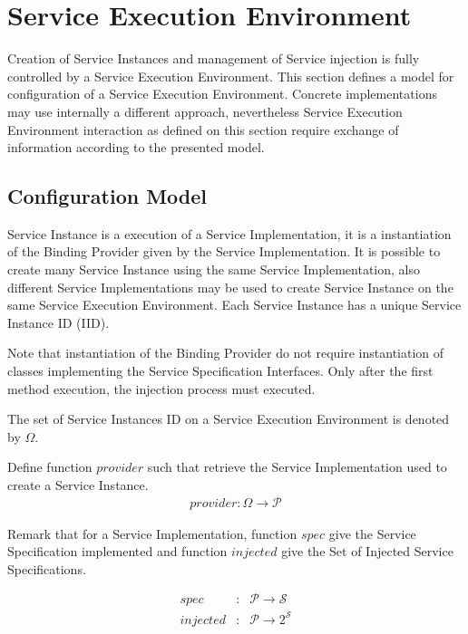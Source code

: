 

\section{Service Execution Environment}
\label{sec:SEE}

Creation of Service Instances and management of Service injection is fully controlled by a Service Execution Environment. This section defines a model for configuration of a Service Execution Environment. Concrete implementations may use internally a different approach, nevertheless Service Execution Environment interaction as defined on this section require exchange of information according to the presented model.

\subsection{Configuration Model}

Service Instance is a execution of a Service Implementation, it is a instantiation of the Binding Provider given by the Service Implementation. It is possible to create many Service Instance using the same Service Implementation, also different Service Implementations may be used to create Service Instance on the same Service Execution Environment. Each Service Instance has a unique Service Instance ID (IID).

Note that instantiation of the Binding Provider do not require instantiation of classes implementing the Service Specification Interfaces. Only after the first method execution, the injection process must executed.

The set of Service Instances ID on a Service Execution Environment is denoted by $\Omega$.

Define function $provider$ such that retrieve the Service Implementation used to create a Service Instance.
\begin{eqnarray}
 provider: \Omega  \rightarrow \mathcal{P}
\end{eqnarray}

Remark that for a Service Implementation, function $spec$ give the Service Specification implemented  and function $injected$ give the Set of Injected Service Specifications.

\begin{eqnarray}
spec &:& \mathcal{P}  \rightarrow \mathcal{S} \nonumber \\
injected &:& \mathcal{P} \rightarrow 2^\mathcal{S} \nonumber
\end{eqnarray}




